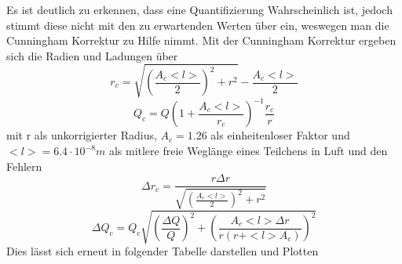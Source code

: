 \documentclass{scrartcl}
\begin{document}
	Es ist deutlich zu erkennen, dass eine Quantifizierung Wahrscheinlich ist, jedoch stimmt diese
	nicht mit den zu erwartenden Werten über ein, weswegen man die Cunningham Korrektur zu Hilfe nimmt.
	Mit der Cunningham Korrektur ergeben sich die Radien und Ladungen über
	\begin{equation}
		r_c = \sqrt{(\frac{A_c <l>}{2})^2 + r^2} - \frac{A_c <l>}{2}  
	\end{equation}
	\begin{equation}
		Q_c = Q(1+\frac{A_c<l>}{r_c})^{-1} \frac{r_c}{r}
	\end{equation}
	mit r als unkorrigierter Radius, $A_c=1.26$ als einheitenloser Faktor und $<l>=6.4\cdot 10^{-8} m$ als
	mitlere freie Weglänge eines Teilchens in Luft und den Fehlern
	\begin{equation}
		\Delta r_c = \frac{r \Delta r}{\sqrt{(\frac{A_c <l>}{2})^2 + r^2}}
	\end{equation}
	\begin{equation}
		\Delta Q_c = Q_c \sqrt{(\frac{\Delta Q}{Q})^2 + (\frac{A_c <l> \Delta r}{r(r+<l>A_c)})^2}
	\end{equation}
	Dies lässt sich erneut in folgender Tabelle darstellen und Plotten
\end{document}
